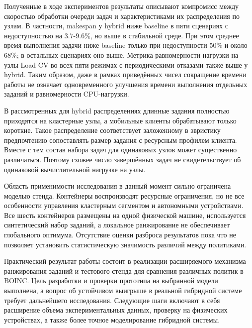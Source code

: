 \documentclass[a4paper,12pt]{extarticle}
\begin{document}
Полученные в ходе экспериментов результаты описывают компромисс между скоростью обработки очереди задач и характеристиками их распределения по узлам. В частности, makespan у hybrid ниже baseline в пяти сценариях с недоступностью на 3.7-9.6\%, но выше в стабильной среде. При этом среднее время выполнения задачи ниже baseline только при недоступности 50\% и около 68\%; в остальных сценариях оно выше. Метрика равномерности нагрузки на узлы Load CV во всех пяти режимах с периодическими отказами также выше у hybrid. Таким образом, даже в рамках приведённых чисел сокращение времени работы не означает одновременного улучшения времени выполнения отдельных заданий и равномерности CPU-нагрузки.

В рассмотренных для hybrid распределениях длинные задания полностью приходятся на кластерные узлы, а мобильные клиенты обрабатывают только короткие. Такое распределение соответствует заложенному в эвристику предпочтению сопоставлять размер задания с ресурсным профилем клиента. Вместе с тем состав набора задач для одинаковых узлов может существенно различаться. Поэтому схожее число завершённых задач не свидетельствует об одинаковой вычислительной нагрузке на узлы.

Область применимости исследования в данный момент сильно ограничена моделью стенда. Контейнеры воспроизводят ресурсные ограничения, но не все особенности управления кластерным сегментом и автономными устройствами. Все шесть контейнеров размещены на одной физической машине, используется синтетический набор заданий, а локальное ранжирование не обеспечивает глобального оптимума. Отсутствие оценки разброса результатов пока что не позволяет установить статистическую значимость различий между политиками.

Практический результат работы состоит в реализации расширяемого механизма ранжирования заданий и тестового стенда для сравнения различных политик в BOINC. Цель разработки и проверки прототипа на выбранной модели выполнена, а вопрос об устойчивом выигрыше в реальной гибридной системе требует дальнейшего исследования. Следующие шаги включают в себя расширение объема экспериментальных данных, проверку на физических устройствах, а также более точное моделирование гибридной системы.

\newpage
\printbibliography[heading=bibintoc]
\end{document}
